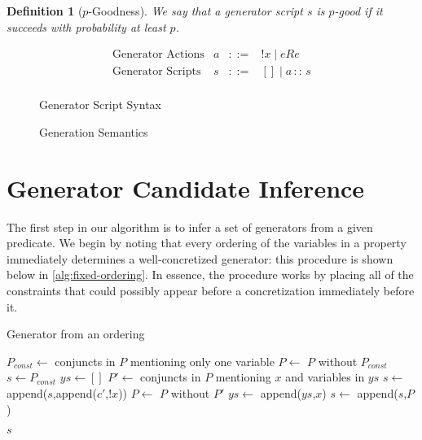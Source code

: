 \documentclass[sigconf,nonacm]{acmart}
\newtheorem{definition}{Definition}
\begin{document}
\begin{definition}[$p$-Goodness]
We say that a generator script $s$ is $p$-good if it succeeds with probability at least $p$.
\end{definition}

\begin{figure}
\caption{Generator Script Syntax}
\label{fig:aluck-syntax}
$$
\begin{array}{llll}
\text{Generator Actions} & a & ::= & !x \;|\; e R e\\
\text{Generator Scripts} & s & ::= & [] \;|\; a \, :: \, s\\
\end{array}
$$
\end{figure}

\begin{figure}
\caption{Generation Semantics}
\label{fig:aluck-semantics}
\begin{mathpar}


\end{mathpar}
\end{figure}

\section{Generator Candidate Inference}
\label{sec:sci}
The first step in our algorithm is to infer a set of generators from a given predicate. We begin by noting that every ordering of the variables in a property immediately determines a well-concretized generator: this procedure is shown below in \autoref{alg:fixed-ordering}. In essence, the procedure works by placing all of the constraints that could possibly appear before a concretization immediately before it.

\begin{algorithm}
    \caption{Generator from an ordering}
    \label{alg:fixed-ordering}
    \begin{algorithmic}
       \State $P_{const} \gets$ conjuncts in $P$ mentioning only one variable
       \State $P \gets$ $P$ without $P_{const}$
       \State $s \gets P_{const}$ 
       \State $ys \gets []$ 
         \State $P' \gets$ conjuncts in $P$ mentioning $x$ and variables in $ys$
         \State $s \gets$ append($s$,append($c'$,$!x$))
         \State $P \gets$ $P$ without $P'$
         \State $ys \gets$ append($ys$,$x$)
       \EndFor
       \State $s \gets$ append($s$,$P$)
       
       \Return $s$
      \EndFunction
    \end{algorithmic}
\end{algorithm}
\end{document}
